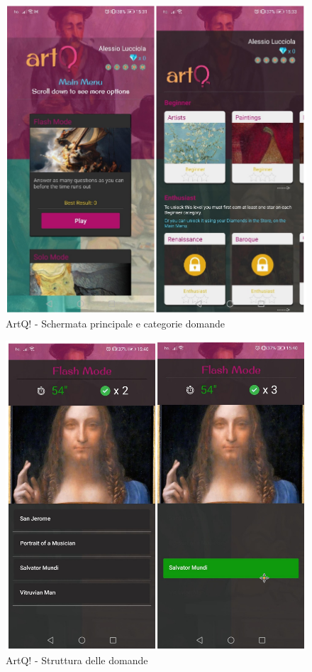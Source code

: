 \documentclass{article}
\begin{document}
\begin{figure}[htp]
\begin{center}
\includegraphics[width=1 \textwidth]{Figure11.png}
\caption{ArtQ! - Schermata principale e categorie domande}
\end{center}
\end{figure}

\begin{figure}[htp]
\begin{center}
\includegraphics[width=1 \textwidth]{Figure12.png}
\caption{ArtQ! - Struttura delle domande}
\end{center}
\end{figure}
\end{document}
